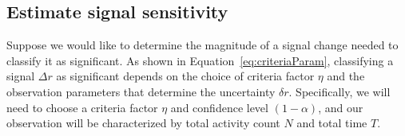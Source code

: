 \documentclass{article}
\begin{document}
%
%
%



\subsection{Estimate signal sensitivity}
\label{ex:3}

Suppose we would like to determine the magnitude of a signal change needed to 
classify it as significant. As shown in Equation~\ref{eq:criteriaParam}, 
classifying a signal $\Delta r$ as significant depends on the choice of criteria factor 
$\eta$ and the observation parameters that determine the uncertainty $\delta r$. 
Specifically, we will need to choose a criteria factor $\eta$ and confidence level 
$(1-\alpha)$, and our observation will be characterized by total activity count $N$ 
and total time $T$.
\end{document}
